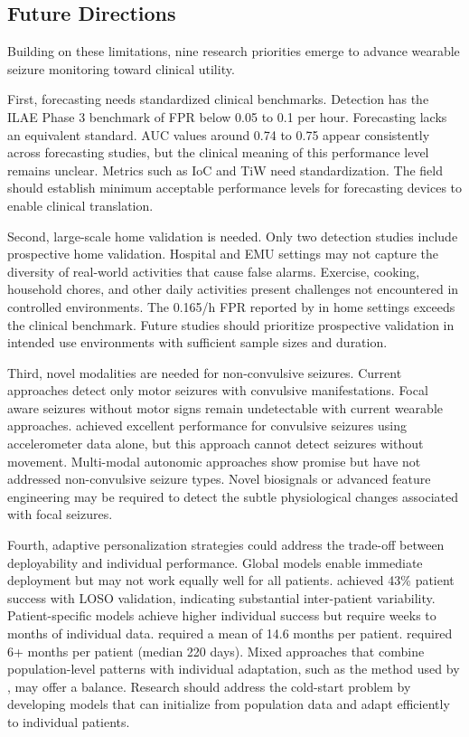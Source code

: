 \subsection{Future Directions}

Building on these limitations, nine research priorities emerge to advance wearable seizure monitoring toward clinical utility.

First, forecasting needs standardized clinical benchmarks. Detection has the ILAE Phase 3 benchmark of FPR below 0.05 to 0.1 per hour. Forecasting lacks an equivalent standard. AUC values around 0.74 to 0.75 appear consistently across forecasting studies, but the clinical meaning of this performance level remains unclear. Metrics such as IoC and TiW need standardization. The field should establish minimum acceptable performance levels for forecasting devices to enable clinical translation.

Second, large-scale home validation is needed. Only two detection studies include prospective home validation. Hospital and EMU settings may not capture the diversity of real-world activities that cause false alarms. Exercise, cooking, household chores, and other daily activities present challenges not encountered in controlled environments. The 0.165/h FPR reported by \textcite{dongTwoLayerEnsembleMethod2022} in home settings exceeds the clinical benchmark. Future studies should prioritize prospective validation in intended use environments with sufficient sample sizes and duration.

Third, novel modalities are needed for non-convulsive seizures. Current approaches detect only motor seizures with convulsive manifestations. Focal aware seizures without motor signs remain undetectable with current wearable approaches. \textcite{spahrDeepLearningbasedDetection2025} achieved excellent performance for convulsive seizures using accelerometer data alone, but this approach cannot detect seizures without movement. Multi-modal autonomic approaches show promise but have not addressed non-convulsive seizure types. Novel biosignals or advanced feature engineering may be required to detect the subtle physiological changes associated with focal seizures.

Fourth, adaptive personalization strategies could address the trade-off between deployability and individual performance. Global models enable immediate deployment but may not work equally well for all patients. \textcite{meiselMachineLearningWristband2020} achieved 43\% patient success with LOSO validation, indicating substantial inter-patient variability. Patient-specific models achieve higher individual success but require weeks to months of individual data. \textcite{stirlingForecastingSeizureLikelihood2021} required a mean of 14.6 months per patient. \textcite{nasseriAmbulatorySeizureForecasting2021} required 6+ months per patient (median 220 days). Mixed approaches that combine population-level patterns with individual adaptation, such as the method used by \textcite{vielufSeizureMonitoringCombined2025}, may offer a balance. Research should address the cold-start problem by developing models that can initialize from population data and adapt efficiently to individual patients.

